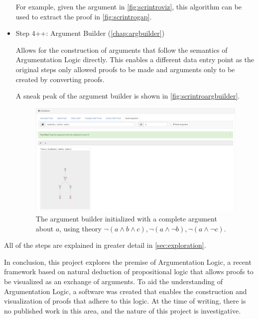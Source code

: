 \documentclass[11pt,twoside,a4paper]{report}
\begin{document}
\begin{itemize}
For example, given the argument in \autoref{fig:scrintroviz}, this algorithm can be used to extract the proof in \autoref{fig:scrintrogap}.
\item
Step 4++: Argument Builder (\autoref{chap:argbuilder})

Allows for the construction of arguments that follow the semantics of Argumentation Logic directly. This enables a different data entry point as the original steps only allowed proofs to be made and arguments only to be created by converting proofs.

A sneak peak of the argument builder is shown in \autoref{fig:scrintroargbuilder}.

\begin{figure}[htp]
\centerline{\includegraphics[scale=0.3]{img/scr-intro-argbuilder.png}}
\caption{The argument builder initialized with a complete argument about $a$, using theory $\neg(a\wedge b\wedge c), \neg(a\wedge\neg b), \neg(a\wedge\neg c)$.\label{fig:scrintroargbuilder}}
\end{figure}
\end{itemize}

All of the steps are explained in greater detail in \autoref{sec:exploration}.

In conclusion, this project explores the premise of Argumentation Logic, a recent framework based on natural deduction of propositional logic that allows proofs to be visualized as an exchange of arguments. To aid the understanding of Argumentation Logic, a software was created that enables the construction and visualization of proofs that adhere to this logic. At the time of writing, there is no published work in this area, and the nature of this project is investigative.
\end{document}
